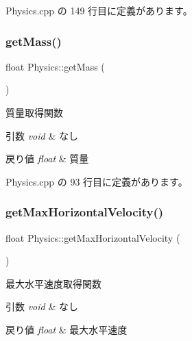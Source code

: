  Physics.\+cpp の 149 行目に定義があります。

\mbox{\label{class_physics_a4ce827465a471657b4f4e8973e9f2138}} 
\subsubsection{\texorpdfstring{get\+Mass()}{getMass()}}
{\footnotesize\ttfamily float Physics\+::get\+Mass (\begin{DoxyParamCaption}{ }\end{DoxyParamCaption})}



質量取得関数 


\begin{DoxyParams}{引数}
{\em void} & なし \\
\hline
\end{DoxyParams}

\begin{DoxyRetVals}{戻り値}
{\em float} & 質量 \\
\hline
\end{DoxyRetVals}


 Physics.\+cpp の 93 行目に定義があります。

\mbox{\label{class_physics_a47edf04cb497a621940b3dfc5e9e6993}} 
\subsubsection{\texorpdfstring{get\+Max\+Horizontal\+Velocity()}{getMaxHorizontalVelocity()}}
{\footnotesize\ttfamily float Physics\+::get\+Max\+Horizontal\+Velocity (\begin{DoxyParamCaption}{ }\end{DoxyParamCaption})}



最大水平速度取得関数 


\begin{DoxyParams}{引数}
{\em void} & なし \\
\hline
\end{DoxyParams}

\begin{DoxyRetVals}{戻り値}
{\em float} & 最大水平速度 \\
\hline
\end{DoxyRetVals}


